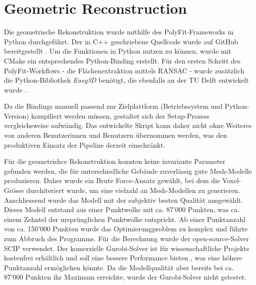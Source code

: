 \section{Geometric Reconstruction}
\begin{German}
    Die geometrische Rekonstruktion wurde mithilfe des PolyFit-Frameworks in Python durchgeführt. Der in C++ geschriebene Quellcode wurde auf GitHub bereitgestellt \cite{nanLiangliangNanPolyFit2025}. Um die Funktionen in Python nutzen zu können, wurde mit CMake ein entsprechendes Python-Binding erstellt. Für den ersten Schritt des PolyFit-Workflows - die Flächenextraktion mittels RANSAC - wurde zusätzlich die Python-Bibliothek \textit{Easy3D} benötigt, die ebenfalls an der TU Delft entwickelt wurde \cite{nanLiangliangNanEasy3D2025}.

    Da die Bindings manuell passend zur Zielplattform (Betriebssystem und Python-Version) kompiliert werden müssen, gestaltet sich der Setup-Prozess vergleichsweise aufwändig. Das entwickelte Skript kann daher nicht ohne Weiteres von anderen Benutzerinnen und Benutzern übernommen werden, was den produktiven Einsatz der Pipeline derzeit einschränkt.

    Für die geometrishce Rekonstruktion konnten keine invariante Parameter gefunden werden, die für unterschiedliche Gebäude zuverlässig gute Mesh-Modelle produzieren. Daher wurde ein Brute Force-Ansatz gewählt, bei dem die Voxel-Grösse durchiteriert wurde, um eine vielzahl an Mesh-Modellen zu generieren. Anschliessend wurde das Modell mit der subjektiv besten Qualität ausgewählt. Dieses Modell entstand aus einer Punktwolke mit ca. 87'000 Punkten, was ca. einem Zehntel der ursprünglichen Punktwolke entspricht. Ab einer Punktanzahl von ca. 150'000 Punkten wurde das Optimierungproblem zu komplex und führte zum Abbruch des Programms. Für die Berechnung wurde der open-source-Solver SCIP verwendet. Der komerzielle Gurobi-Solver ist für wissenschaftliche Projekte kostenfrei erhältlich und soll eine bessere Performance bieten \cite{nanLiangliangNanPolyFit2025}, was eine höhere Punktanzahl ermöglichen könnte. Da die Modellqualität aber bereits bei ca. 87'000 Punkten ihr Maximum erreichte, wurde der Gurobi-Solver nicht getestet. 
\end{German}

